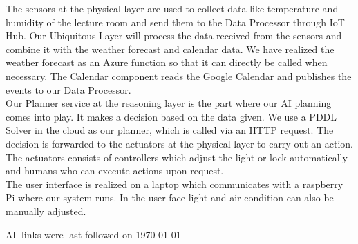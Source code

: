 \documentclass[runningheads]{llncs}
\begin{document}
The sensors at the physical layer are used to collect data like temperature and humidity of the lecture room and send them to the Data Processor through IoT Hub. Our Ubiquitous Layer will process the data received from the sensors and combine it with the weather forecast and calendar data. We have realized the weather forecast as an Azure function so that it can  directly be called when necessary. The Calendar component reads the Google Calendar and publishes the events to our Data Processor.\\
Our Planner service at the reasoning layer is the part where our AI planning comes into play. It makes a decision based on the data given. We use a PDDL Solver in the cloud \cite{solverpl71:online} as our planner, which is called via an HTTP request. The decision is forwarded to the actuators at the physical layer to carry out an action.\\
The actuators consists of controllers which adjust the light or lock automatically and humans who can execute actions upon request.\\
The user interface is realized on a laptop which communicates with a raspberry Pi where our system runs. In the user face light and air condition can also be manually adjusted.











%
%



All links were last followed on \today
\end{document}
